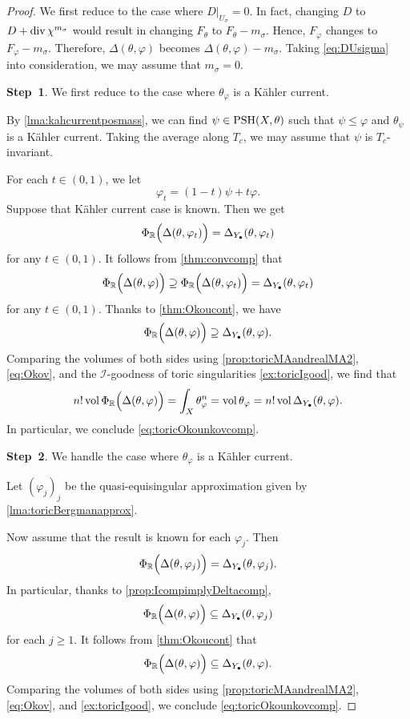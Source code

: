 \begin{proof}
     We first reduce to the case where $D|_{U_{\sigma}}=0$. In fact, changing $D$ to $D+\operatorname{div} \chi^{m_{\sigma}}$ would result in changing $F_{\theta}$ to $F_{\theta}-m_{\sigma}$. Hence, $F_{\varphi}$ changes to $F_{\varphi}-m_{\sigma}$. Therefore, $\Delta(\theta,\varphi)$ becomes $\Delta(\theta,\varphi)-m_{\sigma}$. Taking \eqref{eq:DUsigma} into consideration, we may assume that $m_{\sigma}=0$.

    \textbf{Step~1}. We first reduce to the case where $\theta_{\varphi}$ is a Kähler current.

    By \cref{lma:kahcurrentposmass}, we can find $\psi\in \mathrm{PSH}(X,\theta)$ such that $\psi\leq \varphi$ and $\theta_{\psi}$ is a Kähler current. Taking the average along $T_c$, we may assume that $\psi$ is $T_c$-invariant.

    For each $t\in (0,1)$, we let
    \[
    \varphi_t=(1-t)\psi+t\varphi.
    \]
    Suppose that Kähler current case is known. Then we get
    \[
    \Phi_{\mathbb{R}}\Bigl(  \Delta(\theta,\varphi_t)\Bigr)=\Delta_{Y_{\bullet}}(\theta,\varphi_t)
    \]
    for any $t\in (0,1)$.
    It follows from \cref{thm:convcomp} that
    \[
    \Phi_{\mathbb{R}}\Bigl(  \Delta(\theta,\varphi)\Bigr)\supseteq \Phi_{\mathbb{R}}\Bigl(  \Delta(\theta,\varphi_t)\Bigr)= \Delta_{Y_{\bullet}}(\theta,\varphi_t)
    \]
    for any $t\in (0,1)$. Thanks to \cref{thm:Okoucont}, we have
    \[
    \Phi_{\mathbb{R}}\Bigl(  \Delta(\theta,\varphi)\Bigr)\supseteq \Delta_{Y_{\bullet}}(\theta,\varphi).
    \]
    Comparing the volumes of both sides using \cref{prop:toricMAandrealMA2}, \eqref{eq:Okov}, and the $\mathcal{I}$-goodness of toric singularities \cref{ex:toricIgood}, we find that
    \[
    n!\operatorname{vol} \Phi_{\mathbb{R}}\Bigl(  \Delta(\theta,\varphi)\Bigr)=\int_X \theta_{\varphi}^n=\operatorname{vol} \theta_{\varphi}=n!\operatorname{vol} \Delta_{Y_{\bullet}}(\theta,\varphi).
    \]
    In particular, we conclude \eqref{eq:toricOkounkovcomp}.

    \textbf{Step~2}. We handle the case where $\theta_{\varphi}$ is a Kähler current.

    Let $(\varphi_j)_j$ be the quasi-equisingular approximation given by \cref{lma:toricBergmanapprox}.

    Now assume that the result is known for each $\varphi_j$. Then
    \[
    \Phi_{\mathbb{R}}\Bigl(  \Delta(\theta,\varphi_j)\Bigr)=\Delta_{Y_{\bullet}}(\theta,\varphi_j).
    \]
    In particular, thanks to \cref{prop:IcompimplyDeltacomp},
    \[
    \Phi_{\mathbb{R}}\Bigl(  \Delta(\theta,\varphi)\Bigr)\subseteq \Delta_{Y_{\bullet}}(\theta,\varphi_j)
    \]
    for each $j\geq 1$. It follows from \cref{thm:Okoucont} that
    \[
    \Phi_{\mathbb{R}}\Bigl(  \Delta(\theta,\varphi)\Bigr)\subseteq \Delta_{Y_{\bullet}}(\theta,\varphi).
    \]
    Comparing the volumes of both sides using \cref{prop:toricMAandrealMA2}, \eqref{eq:Okov}, and \cref{ex:toricIgood}, we conclude \eqref{eq:toricOkounkovcomp}.


\end{proof}
